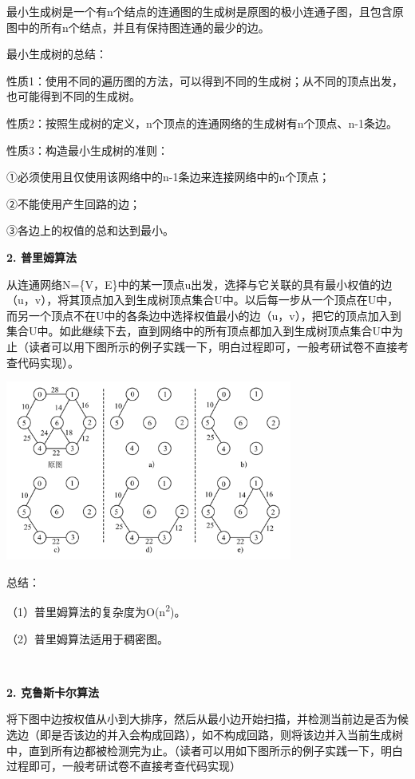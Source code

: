 {最小生成树是{一个有n个结点的连通图的生成树是原图的极小连通子图，且包含原图中的所有n个结点，并且有保持图连通的最少的边。}}

{最小生成树的总结：}

{性质1：使用不同的遍历图的方法，可以得到不同的生成树；从不同的顶点出发，也可能得到不同的生成树。}

{性质2：按照生成树的定义，n个顶点的连通网络的生成树有n个顶点、n-1条边。}

{性质3：构造最小生成树的准则：}

{①必须使用且仅使用该网络中的n-1条边来连接网络中的n个顶点；}

{②不能使用产生回路的边；}

{③各边上的权值的总和达到最小。}

{\textbf{2. 普里姆算法}}

{从连通网络N=\{V，E\}中的某一顶点u出发，选择与它关联的具有最小权值的边（u，v），将其顶点加入到生成树顶点集合U中。以后每一步从一个顶点在U中，而另一个顶点不在U中的各条边中选择权值最小的边（u，v），把它的顶点加入到集合U中。如此继续下去，直到网络中的所有顶点都加入到生成树顶点集合U中为止（读者可以用下图所示的例子实践一下，明白过程即可，一般考研试卷不直接考查代码实现）。}

\includegraphics[width=3.70833in,height=2.32292in]{png-jpeg-pics/D43193B0360B43E38FBD1456AE03CDF3.png}

{总结：}

{（1）普里姆算法的复杂度为O(n\textsuperscript{2})。}

{（2）{普里姆算法适用于稠密图}。}

{\\
}

{\textbf{2. 克鲁斯卡尔算法}}

{将下图中边按权值从小到大排序，然后从最小边开始扫描，并检测当前边是否为候选边（即是否该边的并入会构成回路），如不构成回路，则将该边并入当前生成树中，直到所有边都被检测完为止。（读者可以用如下图所示的例子实践一下，明白过程即可，一般考研试卷不直接考查代码实现）}

